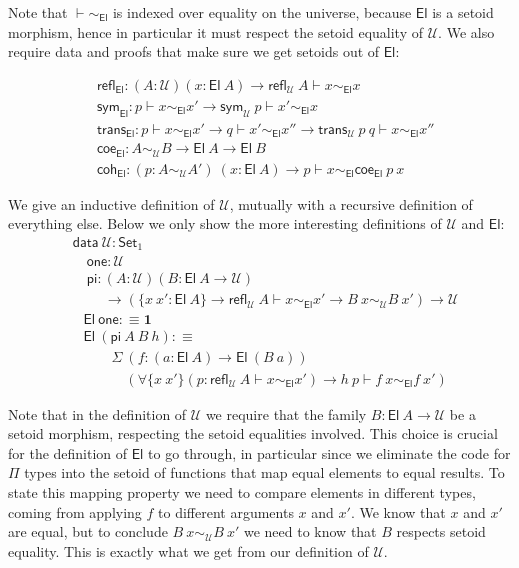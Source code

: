 \documentclass{easychair}
\newcommand{\setoidU}{\mathcal{U}}
\newcommand{\Set}{\textsf{Set}}
\newcommand{\El}{\textsf{El}}
\newcommand{\reflu}{\textsf{refl}_\setoidU}
\newcommand{\symu}{\textsf{sym}_\setoidU}
\newcommand{\transu}{\textsf{trans}_\setoidU}
\newcommand{\coeel}{\textsf{coe}_\El}
\newcommand{\cohel}{\textsf{coh}_\El}
\newcommand{\equ}[2]{#1 \sim_\setoidU #2}
\newcommand{\eqel}[3]{#1 \vdash #2 \sim_\El #3}
\begin{document}
Note that $\eqel{}{}{}$ is indexed over equality on the universe, because $\El$
is a setoid morphism, hence in particular it must respect the setoid equality of
$\setoidU$.
%
We also require data and proofs that make sure we get setoids out of $\El$:

\begin{align*}
  & \textsf{refl}_\El : (A : \setoidU) (x : \El\ A) \to \eqel{\reflu\ A}{x}{x} \\
  & \textsf{sym}_\El : \eqel{p}{x}{x'} \to \eqel{\symu\ p}{x'}{x} \\
  & \textsf{trans}_\El : \eqel{p}{x}{x'} \to \eqel{q}{x'}{x''} \to \eqel{\transu\ p\ q}{x}{x''} \\
  & \coeel : \equ{A}{B} \to \El\ A \to \El\ B \\
  & \cohel : (p : \equ{A}{A'}) \ (x : \El\ A) \to \eqel{p}{x}{\coeel\ p\ x}
\end{align*}


We give an inductive definition of $\setoidU$, mutually with a recursive
definition of everything else. Below we only show the more interesting definitions of $\setoidU$ and $\El$:
%
\begin{align*}
  & \textsf{data}\ \setoidU : \Set_1 \\
  & \quad \textsf{one} : \setoidU \\
  & \quad \textsf{pi}
  :  (A : \setoidU) (B : \El\ A \to \setoidU)\\
  & \ \qquad \to (\{x\ x' : \El\ A\} \to \textsf{refl}_\setoidU\ A \vdash x \sim_\El x' \to B\ x \sim_\setoidU B\ x')
  \to \setoidU
\end{align*}
%
\begin{align*}
  & \El\ \textsf{one} :\equiv \textbf{1} \\
  & \El\ (\textsf{pi}\ A\ B\ h) :\equiv \\
  & \qquad \Sigma\ (f : (a : \El\ A) \to \El\ (B\ a)) \\
  & \qquad \quad
  (\forall\{x\ x'\}(p : \eqel{\reflu\ A}{x}{x'}) \to \eqel{h\ p}{f\ x}{f\ x'})
\end{align*}

Note that in the definition of $\setoidU$ we require that the family $B : \El\ A
\to \setoidU$ be a setoid morphism, respecting the setoid equalities involved.
%
This choice is crucial for the definition of $\El$ to go through, in particular
since we eliminate the code for $\Pi$ types into the setoid of functions that
map equal elements to equal results. To state this mapping property we need to
compare elements in different types, coming from applying $f$ to different
arguments $x$ and $x'$. We know that $x$ and $x'$ are equal, but to conclude
$\equ{B\ x}{B\ x'}$ we need to know that $B$ respects setoid equality. This is
exactly what we get from our definition of $\setoidU$.
\end{document}
